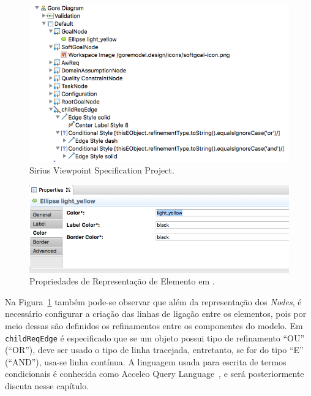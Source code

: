 \begin{figure}
	\centering
	\includegraphics[width=1\textwidth]{figuras/unagi/exemplo-sirius-vsp.png}
	\caption{Sirius Viewpoint Specification Project.}
	\label{exemplo-sirius-vsp}
\end{figure}

\begin{figure}
	\centering
	\includegraphics[width=1\textwidth]{figuras/unagi/exemplo-propriedades-personalizacao.png}
	\caption{Propriedades de Representação de Elemento em \sirius.}
	\label{figura-propriedades-personalizacao}
\end{figure}

Na Figura~\ref{exemplo-sirius-vsp} também pode-se observar que além da representação dos \textit{Nodes}, é necessário configurar a criação das linhas de ligação entre os elementos, pois por meio dessas são definidos os refinamentos entre os componentes do modelo. Em \texttt{childReqEdge} é especificado que se um objeto possui tipo de refinamento ``OU'' (``OR''), deve ser usado o tipo de linha tracejada, entretanto, se for do tipo ``E'' (``AND''), usa-se linha contínua. A linguagem usada para escrita de termos condicionais é conhecida como Acceleo Query Language~\cite{musset2006acceleo}, e será posteriormente discuta nesse capítulo.

